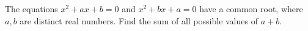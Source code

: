The equations $x^2+ax+b=0$ and $x^2+bx+a=0$ have a common root, where $a,b$ are distinct real numbers. Find the sum of all possible values of $a+b$.
